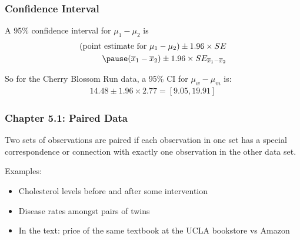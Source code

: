 \documentclass[slides]{beamer}
\newcommand{\blue}[1]{\textcolor{blue2}{#1}}
\newcommand{\xbar}{\overline{x}}
\begin{document}
\begin{frame}[fragile]
\frametitle{Confidence Interval}

A 95\% confidence interval for $\mu_1 - \mu_2$ is
\begin{eqnarray*}
(\mbox{point estimate for } \mu_1 - \mu_2) \pm 1.96 \times SE\\
\pause(\xbar_1 - \xbar_2) \pm 1.96 \times SE_{\xbar_1 - \xbar_2}
\end{eqnarray*}

\pause So for the Cherry Blossom Run data, a 95\% CI for $\mu_w - \mu_m$ is:
\begin{eqnarray*}
14.48 \pm 1.96 \times 2.77 =  [9.05, 19.91]
\end{eqnarray*}

\end{frame}








\begin{frame}[fragile]
\frametitle{Chapter 5.1: Paired Data}
Two sets of observations are \blue{paired} if each observation in one set has a special correspondence or connection with exactly one observation in the other data set.

\vspace{0.25cm} 

\pause Examples:

\begin{itemize}
\item Cholesterol levels before and after some intervention
\pause \item Disease rates amongst pairs of twins
\pause \item In the text:  price of the same textbook at the UCLA bookstore vs Amazon
\end{itemize}

\end{frame}
\end{document}
